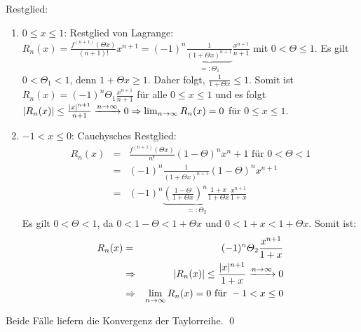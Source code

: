 \documentclass[ngerman,titlepage,twoside, parskip=half*]{scrreprt}
\theoremstyle{break}
\theoremstyle{nonumberbreak}
\DeclarePairedDelimiter{\abs}{\lvert}{\rvert}
\begin{document}
Restglied:
\begin{enumerate}[1. F{a}ll]
  \item $0\leq x\leq 1$: Restglied von Lagrange:\\
    $R_n(x)=\frac{f^{(n+1)}(\Theta x)}{(n+1)!}x^{n+1}=(-1)^n
    \underbrace{\frac{1}{(1+\Theta x)^{n+1}}}_{=:\Theta_1}
    \frac{x^{n+1}}{n+1}$ mit $0<\Theta\leq 1$. Es gilt $0<\Theta_1<1$,
    denn $1+\Theta x\geq 1$. Daher folgt, $\frac{1}{1+\Theta x}\leq 1$.
    Somit ist $R_n(x)=(-1)^n\Theta_1\frac{x^{n+1}}{n+1}$ für alle
    $0\leq x\leq 1$ und es folgt $\abs{R_n(x)}\leq\frac{\abs{x}^{n+1}}{n+1}
    \xrightarrow{n\rightarrow\infty} 0\Rightarrow\lim_{n\rightarrow\infty}
    R_n(x)=0$ für $0\leq x \leq 1$.
  \item $-1<x\leq 0$: Cauchysches Restglied:\\
    \begin{align*}
      R_n(x)&=& \frac{f^{(n+1)}(\Theta x)}{n!}(1-\Theta)^nx^n+1\text{ für }
      0<\Theta <1\\
      &=& (-1)^n\frac{1}{(1+\Theta x)^{n+1}}(1-\Theta)^nx^{n+1}\\
      &=& (-1)^n\underbrace{\left( \frac{1-\Theta}{1+\Theta x} \right)^n
      \frac{1+x}{1+\Theta x}}_{=:\Theta_2}\frac{x^{n+1}}{1+x}
    \end{align*}
    Es gilt $0<\Theta<1$, da $0<1-\Theta<1+\Theta x$ und $0<1+x<1+\Theta x$.
    Somit ist:
    \begin{align*}
      R_n(x)&=& (-1)^n\Theta_2\frac{x^{n+1}}{1+x}\\
      &\Rightarrow & \abs{R_n(x)}\leq\frac{\abs{x}^{n+1}}{1+x}\xrightarrow{n\rightarrow\infty} 0\\
      &\Rightarrow & \lim_{n\rightarrow\infty} R_n(x)=0\text{ für }
      -1<x\leq 0
    \end{align*}
\end{enumerate}
Beide Fälle liefern die Konvergenz der Taylorreihe.
\qed
\end{document}
